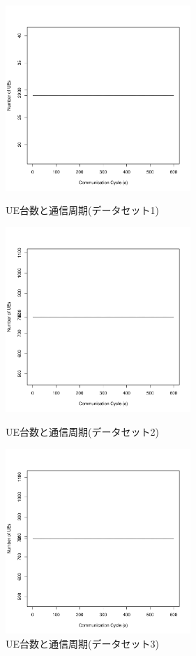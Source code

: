 \documentclass[a4j]{ujarticle}
\begin{document}
\begin{figure}[htbp]
 \begin{minipage}{0.5\hsize}
  \begin{center}
   \includegraphics[width=70mm]{UE_cycle_dataset1.pdf}
  \end{center}
  \caption{UE台数と通信周期(データセット1)}
  \label{UE_cycle_dataset1}
 \end{minipage}
 \begin{minipage}{0.5\hsize}
 \begin{center}
  \includegraphics[width=70mm]{UE_cycle_dataset2.pdf}
 \end{center}
  \caption{UE台数と通信周期(データセット2)}
  \label{UE_cycle_dataset2}
 \end{minipage}
 \begin{minipage}{0.5\hsize}
 \begin{center}
  \includegraphics[width=70mm]{UE_cycle_dataset3.pdf}
 \end{center}
  \caption{UE台数と通信周期(データセット3)}
  \label{UE_cycle_dataset3}
 \end{minipage}
\end{figure}
\end{document}

